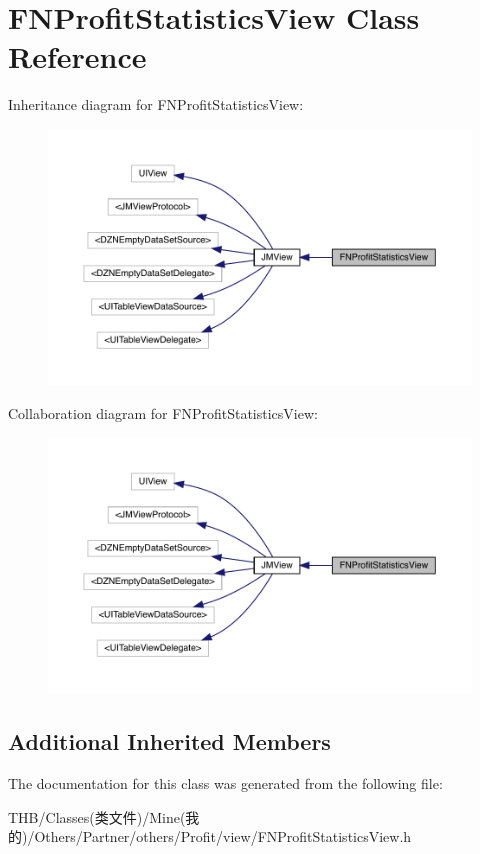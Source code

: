 \hypertarget{interface_f_n_profit_statistics_view}{}\section{F\+N\+Profit\+Statistics\+View Class Reference}
\label{interface_f_n_profit_statistics_view}


Inheritance diagram for F\+N\+Profit\+Statistics\+View\+:\nopagebreak
\begin{figure}[H]
\begin{center}
\leavevmode
\includegraphics[width=350pt]{interface_f_n_profit_statistics_view__inherit__graph}
\end{center}
\end{figure}


Collaboration diagram for F\+N\+Profit\+Statistics\+View\+:\nopagebreak
\begin{figure}[H]
\begin{center}
\leavevmode
\includegraphics[width=350pt]{interface_f_n_profit_statistics_view__coll__graph}
\end{center}
\end{figure}
\subsection*{Additional Inherited Members}


The documentation for this class was generated from the following file\+:\begin{DoxyCompactItemize}
\item 
T\+H\+B/\+Classes(类文件)/\+Mine(我的)/\+Others/\+Partner/others/\+Profit/view/F\+N\+Profit\+Statistics\+View.\+h\end{DoxyCompactItemize}
